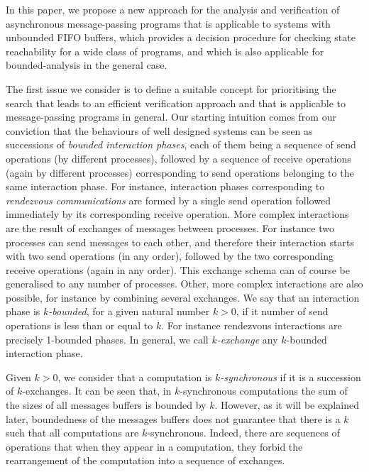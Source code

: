 In this paper, we propose a new approach for the analysis and verification of asynchronous message-passing programs that is applicable to systems with unbounded FIFO buffers, which provides a decision procedure for checking state reachability for a wide class of programs, and which is also applicable for bounded-analysis in the general case. 

The first issue we consider is to define a suitable concept for prioritising the search that leads to an efficient verification approach and that is applicable to message-passing programs in general. Our starting intuition comes from our conviction that the behaviours of well designed systems can be seen as successions of {\em bounded interaction phases}, each of them being a sequence of send operations (by different processes), followed by a sequence of receive operations (again by different processes) corresponding to send operations belonging to the same interaction phase. For instance, interaction phases corresponding to {\em rendezvous communications} are formed by a single send operation followed immediately by its corresponding receive operation. More complex interactions are the result of exchanges of messages between processes. For instance two processes can send messages to each other, and therefore their interaction starts with two send operations (in any order), followed by the two corresponding receive operations (again in any order). This exchange schema can of course be generalised to any number of processes. Other, more complex interactions are also possible, for instance by combining several exchanges. We say that an interaction phase is {\em $k$-bounded}, for a given natural number $k > 0$, if it number of send operations is less than or equal to $k$. For instance rendezvous interactions are precisely 1-bounded phases.  In general, we call {\em $k$-exchange} any $k$-bounded interaction phase. 

Given $k > 0$, we consider that a computation is {\em $k$-synchronous} if it is a succession of $k$-exchanges.
It can be seen that, in $k$-synchronous computations the sum of the sizes of all messages buffers is bounded by $k$. However, as it will be explained later, boundedness of the messages buffers does not guarantee that there is a $k$ such that all computations are $k$-synchronous. Indeed, there are sequences of operations that when they appear in a computation, they forbid the rearrangement of the computation into a sequence of exchanges.  

